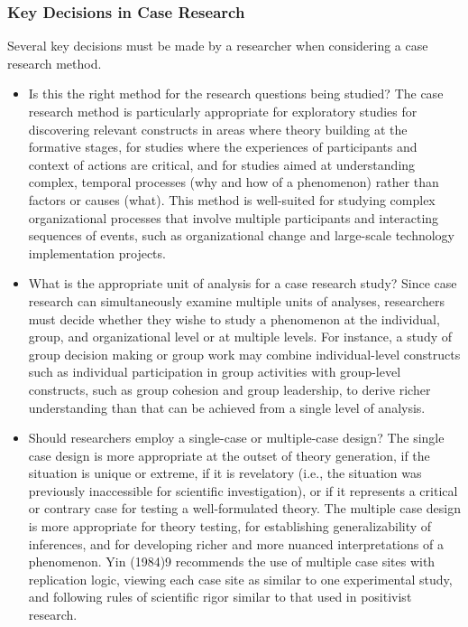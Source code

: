 \subsubsection{Key Decisions in Case Research}

Several key decisions must be made by a researcher when considering a case research method. 

\begin{itemize}
	\item Is this the right method for the research questions being studied? The case research method is particularly appropriate for exploratory studies for discovering relevant constructs in areas where theory building at the formative stages, for studies where the experiences of participants and context of actions are critical, and for studies aimed at understanding complex, temporal processes (why and how of a phenomenon) rather than factors or causes (what). This method is well-suited for studying complex organizational processes that involve multiple participants and interacting sequences of events, such as organizational change and large-scale technology implementation projects.

	\item What is the appropriate unit of analysis for a case research study? Since case research can simultaneously examine multiple units of analyses, researchers must decide whether they wishe to study a phenomenon at the individual, group, and organizational level or at multiple levels. For instance, a study of group decision making or group work may combine individual-level constructs such as individual participation in group activities with group-level constructs, such as group cohesion and group leadership, to derive richer understanding than that can be achieved from a single level of analysis.

	\item Should researchers employ a single-case or multiple-case design? The single case design is more appropriate at the outset of theory generation, if the situation is unique or extreme, if it is revelatory (i.e., the situation was previously inaccessible for scientific investigation), or if it represents a critical or contrary case for testing a well-formulated theory. The multiple case design is more appropriate for theory testing, for establishing generalizability of inferences, and for developing richer and more nuanced interpretations of a phenomenon. Yin (1984)9 recommends the use of multiple case sites with replication logic, viewing each case site as similar to one experimental study, and following rules of scientific rigor similar to that used in positivist research.


\end{itemize}
